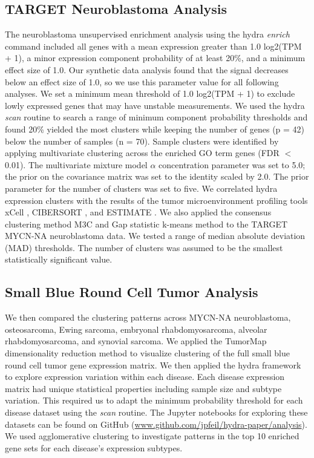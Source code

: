 \documentclass[10pt,letterpaper]{article}
\begin{document}
\subsection*{TARGET Neuroblastoma Analysis}
The neuroblastoma unsupervised enrichment analysis using the hydra \textit{enrich} command included all genes with a mean expression greater than 1.0 log2(TPM + 1), a minor expression component probability of at least 20\%, and a minimum effect size of 1.0. Our synthetic data analysis found that the signal decreases below an effect size of 1.0, so we use this parameter value for all following analyses. We set a minimum mean threshold of 1.0 log2(TPM + 1) to exclude lowly expressed genes that may have unstable measurements. We used the hydra \textit{scan} routine to search a range of minimum component probability thresholds and found 20\% yielded the most clusters while keeping the number of genes (p = 42) below the number of samples (n = 70). Sample clusters were identified by applying multivariate clustering across the enriched GO term genes (FDR $<$ 0.01). The multivariate mixture model $\alpha$ concentration parameter was set to 5.0; the prior on the covariance matrix was set to the identity scaled by 2.0. The prior parameter for the number of clusters was set to five. We correlated hydra expression clusters with the results of the tumor microenvironment profiling tools xCell \cite{aranXCellDigitallyPortraying2017}, CIBERSORT \cite{newmanRobustEnumerationCell2015}, and ESTIMATE \cite{yoshiharaInferringTumourPurity2013a}. We also applied the consensus clustering method M3C \cite{johnM3CMonteCarlo2018} and Gap statistic k-means method \cite{tibshirani2001estimating} to the TARGET MYCN-NA neuroblastoma data. We tested a range of median absolute deviation (MAD) thresholds. The number of clusters was assumed to be the smallest statistically significant value.

\subsection*{Small Blue Round Cell Tumor Analysis}
We then compared the clustering patterns across MYCN-NA neuroblastoma, osteosarcoma, Ewing sarcoma, embryonal rhabdomyosarcoma, alveolar rhabdomyosarcoma, and synovial sarcoma. We applied the TumorMap dimensionality reduction method \cite{newtonTumorMapExploringMolecular2017} to visualize clustering of the full small blue round cell tumor gene expression matrix. We then applied the hydra framework to explore expression variation within each disease. Each disease expression matrix had unique statistical properties including sample size and subtype variation. This required us to adapt the minimum probability threshold for each disease dataset using the \textit{scan} routine. The Jupyter notebooks for exploring these datasets can be found on GitHub (\url{www.github.com/jpfeil/hydra-paper/analysis}). We used agglomerative clustering to investigate patterns in the top 10 enriched gene sets for each disease's expression subtypes.
\end{document}
